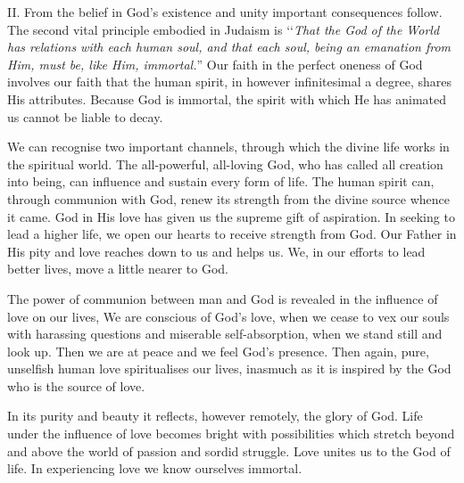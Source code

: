 \label{unity}

II. From the belief in God's existence
and unity important consequences follow.
The second vital principle embodied in
Judaism is ‘‘\textsl{That the God of the World has
relations with each human soul, and that each
soul, being an emanation from Him, must be,
like Him, immortal.}” Our faith in the perfect
oneness of God involves our faith that the
human spirit, in however infinitesimal a
degree, shares His attributes. Because God
is immortal, the spirit with which He has
animated us cannot be liable to decay.

We can recognise two important channels,
through which the divine life works in the
spiritual world. The all-powerful, all-loving
God, who has called all creation into being,
can influence and sustain every form of life.
The human spirit can, through communion
with God, renew its strength from the divine
source whence it came. God in His love
has given us the supreme gift of aspiration.
In seeking to lead a higher life, we open our
hearts to receive strength from God. Our
Father in His pity and love reaches down
to us and helps us. We, in our efforts to
lead better lives, move a little nearer to
God.

The power of communion between man
and God is revealed in the influence of love
on our lives, We are conscious of God’s
love, when we cease to vex our souls with
harassing questions and miserable self-absorption,
when we stand still and look up. Then
we are at peace and we feel God’s presence.
Then again, pure, unselfish human love
spiritualises our lives, inasmuch as it is
inspired by the God who is the source of love.

In its purity and beauty it reflects, however
remotely, the glory of God. Life under the
influence of love becomes bright with
possibilities which stretch beyond and above
the world of passion and sordid struggle.
Love unites us to the God of life. In experiencing
love we know ourselves immortal.

